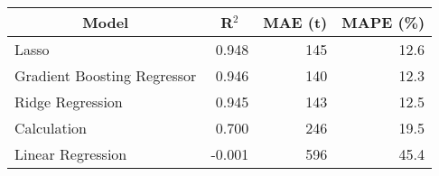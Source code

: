 
\begin{tabular}[t]{lrrr}
\toprule
\multicolumn{1}{c}{Model} & \multicolumn{1}{c}{R$^2$} & \multicolumn{1}{c}{MAE (t)} & \multicolumn{1}{c}{MAPE (\%)}\\
\midrule
Lasso & 0.948 & 145 & 12.6\\
Gradient Boosting Regressor & 0.946 & 140 & 12.3\\
Ridge Regression & 0.945 & 143 & 12.5\\
Calculation & 0.700 & 246 & 19.5\\
Linear Regression & -0.001 & 596 & 45.4\\
\bottomrule
\end{tabular}
